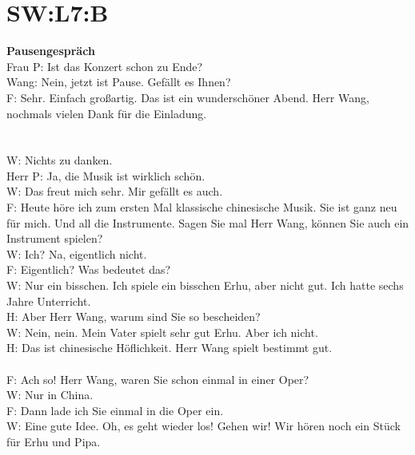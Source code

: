 \section{SW:L7:B}
\noindent
\textbf{Pausengespräch} \\
Frau P: Ist das Konzert schon zu Ende? \\
Wang: Nein, jetzt ist Pause. Gefällt es Ihnen? \\
F: Sehr. Einfach großartig.  Das ist ein wunderschöner Abend. Herr Wang, nochmals vielen Dank für die Einladung.  \\
\\
\\
\noindent
W: Nichts zu danken. \\
Herr P: Ja, die Musik ist wirklich schön.  \\
W: Das freut mich sehr. Mir gefällt es auch. \\
F: Heute höre ich zum ersten Mal klassische chinesische Musik. Sie ist ganz neu für mich. Und all die Instrumente.  Sagen Sie mal Herr Wang, können Sie auch ein Instrument spielen? \\
W: Ich? Na, eigentlich nicht.  \\
F: Eigentlich? Was bedeutet das?  \\
W: Nur ein bisschen. Ich spiele ein bisschen Erhu, aber nicht gut. Ich hatte sechs Jahre Unterricht. \\
H: Aber Herr Wang, warum sind Sie so bescheiden?  \\
W: Nein, nein. Mein Vater spielt sehr gut Erhu. Aber ich nicht. \\
H: Das ist chinesische Höflichkeit.  Herr Wang spielt bestimmt gut.  \\
\\
\noindent
F: Ach so! Herr Wang, waren Sie schon einmal in einer Oper? \\
W: Nur in China. \\
F: Dann lade ich Sie einmal in die Oper ein.  \\
W: Eine gute Idee. Oh, es geht wieder los! Gehen wir!  Wir hören noch ein Stück für Erhu und Pipa. \\

